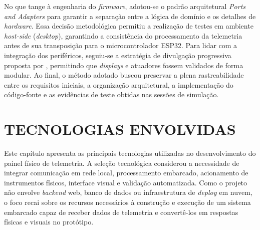 \documentclass[
  12pt,
  oneside,
  a4paper,
  chapter=TITLE,
  section=TITLE,
  subsection=TITLE,
  brazil
]{abntex2}
\newcommand{\estrangeirismo}[1]{\textit{#1}}
\begin{document}
No que tange à engenharia do \textit{firmware}, adotou-se o padrão arquitetural \textit{Ports and Adapters} para garantir a separação entre a lógica de domínio e os detalhes de \estrangeirismo{hardware}. Essa decisão metodológica permitiu a realização de testes em ambiente \textit{host-side} (\textit{desktop}), garantindo a consistência do processamento da telemetria antes de sua transposição para o microcontrolador ESP32. Para lidar com a integração dos periféricos, seguiu-se a estratégia de divulgação progressiva proposta por , permitindo que \estrangeirismo{displays} e atuadores fossem validados de forma modular. Ao final, o método adotado buscou preservar a plena rastreabilidade entre os requisitos iniciais, a organização arquitetural, a implementação do código-fonte e as evidências de teste obtidas nas sessões de simulação.

\chapter{TECNOLOGIAS ENVOLVIDAS}

Este capítulo apresenta as principais tecnologias utilizadas no desenvolvimento do painel físico de telemetria. A seleção tecnológica considerou a necessidade de integrar comunicação em rede local, processamento embarcado, acionamento de instrumentos físicos, interface visual e validação automatizada. Como o projeto não envolve \estrangeirismo{backend} web, banco de dados ou infraestrutura de \estrangeirismo{deploy} em nuvem, o foco recai sobre os recursos necessários à construção e execução de um sistema embarcado capaz de receber dados de telemetria e convertê-los em respostas físicas e visuais no protótipo.
\end{document}
